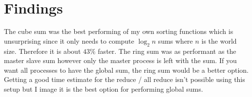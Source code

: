 \documentclass{article}
\begin{document}
\section*{Findings}

The cube sum was the best performing of my own sorting functions which is unsurprising since it only needs to compute $\log_2n$ sums where $n$ is the world size. Therefore it is about $43\%$ faster. The ring sum was as performant as the master slave sum however only the master process is left with the sum. If you want all processes to have the global sum, the ring sum would be a better option. Getting a good time estimate for the reduce / all reduce isn't possible using this setup but I image it is the best option for performing global sums.
\end{document}
